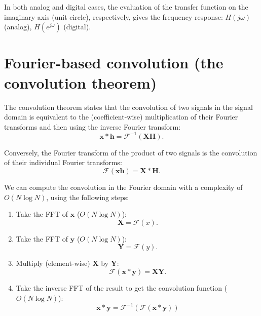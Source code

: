 In both analog and digital cases, the evaluation of the transfer function on
the imaginary axis (unit circle), respectively, gives the frequency
response: $H(j\omega)$ (analog), $H(e^{j\omega})$ (digital).

\section{Fourier-based convolution (the convolution theorem)}
\label{sec:convolution_theorem}

The convolution theorem states that the convolution of two signals in
the signal domain is equivalent to the (coefficient-wise)
multiplication of their Fourier transforms and then using the
inverse Fourier transform:
\begin{equation}
  \mathbf{x}\ast\mathbf{h} = \mathcal{F}^{-1}(\mathbf{X}\mathbf{H}).
\end{equation}

Conversely, the Fourier transform of the product of two signals is
the convolution of their individual Fourier transforms:
\begin{equation}
  \mathcal{F}(\mathbf{x}\mathbf{h}) = \mathbf{X}\ast\mathbf{H}.
\end{equation}

We can compute the convolution in the Fourier domain with a complexity
of $O(N\log N)$, using the following steps:
\begin{enumerate}
\item Take the FFT of $\mathbf{x}$ ($O(N\log N)$):
  \begin{equation}
    \mathbf{X} = \mathcal{F}(x).
  \end{equation}
\item Take the FFT of $\mathbf{y}$ ($O(N\log N)$):
  \begin{equation}
    \mathbf{Y} = \mathcal{F}(y).
  \end{equation}
\item Multiply (element-wise) $\mathbf{X}$ by
  $\mathbf{Y}$:
  \begin{equation}
    \mathcal{F}(\mathbf{x}\ast\mathbf{y})=\mathbf{X}\mathbf{Y}.
  \end{equation}
\item Take the inverse FFT of the result to get the convolution
  function ($O(N\log N)$):
  \begin{equation}
    \mathbf{x}\ast\mathbf{y} = \mathcal{F}^{-1}(\mathcal{F}(\mathbf{x}\ast\mathbf{y}))
  \end{equation}
\end{enumerate}

